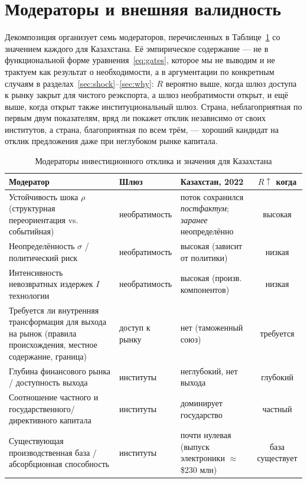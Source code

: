 \documentclass[12pt]{article}
\begin{document}
\section{Модераторы и внешняя валидность}\label{sec:moderators}

Декомпозиция организует семь модераторов, перечисленных в Таблице~\ref{tab:moderators} со
значением каждого для Казахстана. Её эмпирическое содержание — не в функциональной форме
уравнения~\eqref{eq:gates}, которое мы не выводим и не трактуем как результат о
необходимости, а в аргументации по конкретным случаям в
разделах~\ref{sec:shock}--\ref{sec:why}: $R$ вероятно выше, когда шлюз доступа к рынку
закрыт для чистого реэкспорта, а шлюз необратимости открыт, и ещё выше, когда открыт также
институциональный шлюз. Страна, неблагоприятная по первым двум показателям, вряд ли покажет
отклик независимо от своих институтов, а страна, благоприятная по всем трём, — хороший
кандидат на отклик предложения даже при неглубоком рынке капитала.

\begin{table}[t]
\centering
\caption{Модераторы инвестиционного отклика и значения для Казахстана}
\label{tab:moderators}
\small
\begin{tabular}{@{}p{5.4cm}p{2.3cm}p{3.1cm}c@{}}
\toprule
Модератор & Шлюз & Казахстан, 2022 & $R\!\uparrow$ когда \\
\midrule
Устойчивость шока $\rho$ (структурная переориентация vs. событийная) & необратимость & поток сохранился \emph{постфактум}; \emph{заранее} неопределённо & высокая \\
Неопределённость $\sigma$ / политический риск & необратимость & высокая (зависит от политики) & низкая \\
Интенсивность невозвратных издержек $I$ технологии & необратимость & высокая (произв. компонентов) & низкая \\
Требуется ли внутренняя трансформация для выхода на рынок (правила происхождения, местное содержание, граница) & доступ к рынку & нет (таможенный союз) & требуется \\
Глубина финансового рынка / доступность выхода & институты & неглубокий, нет выхода & глубокий \\
Соотношение частного и государственного/директивного капитала & институты & доминирует государство & частный \\
Существующая производственная база / абсорбционная способность & институты & почти нулевая (выпуск электроники $\approx$ \$230 млн) & база существует \\
\bottomrule
\end{tabular}
\end{table}
\end{document}
